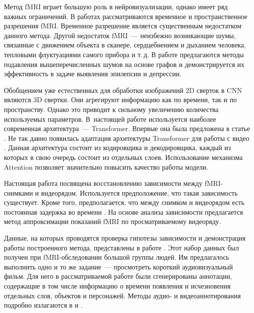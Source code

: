 \documentclass[a4paper, 12pt]{article}
\begin{document}
	Метод fMRI играет большую роль в нейровизуализации, однако имеет ряд важных ограничений.
	В работах \citep{menon1999spatial, logothetis2008we} рассматриваются 
	временное и пространственное разрешения fMRI. Временное разрешение является существенным
	недостатком данного метода. Другой недостаток fMRI~--- неизбежно возникающие шумы, 
	связанные с движением объекта в сканере, сердцебиением и дыханием человека, тепловыми
	флуктуациями самого прибора и т.\,д. В работе \citep{1804.10167} предлагаются методы 
	подавления вышеперечисленных шумов на основе графов и демонстрируется их эффективность в задаче
	выявления эпилепсии и депрессии.

	Обобщением уже естественных для обработки изображений 2D сверток в CNN являются 3D свертки.
	Они агрегируют информацию как по времени, так и по пространству.
	Однако это приводит к сильному увеличению количества используемых параметров.
	В~настоящей работе используется наиболее современная архитектура~--- Transformer.
	Впервые она была предложена в статье \citep{https://doi.org/10.48550/arxiv.1706.03762}.
	Не так давно появилась адаптация архитектуры Transformer для работы с видео
	\citep{https://doi.org/10.48550/arxiv.2201.04288}. Данная архитектура состоит из кодировщика
	и декодировщика, каждый из которых в свою очередь состоит из отдельных слоев. Использование 
	механизма Attention \citep{https://doi.org/10.48550/arxiv.1706.03762} 
	позволяет значительно повысить качество работы модели.

	Настоящая работа посвящена восстановлению зависимости между fMRI-снимками и видеорядом.
	Используется предположение, что такая зависимость существует.
	Кроме того, предполагается, что между снимком и видеорядом есть постоянная задержка во времени
	\citep{Logothetis2003}.
	На основе анализа зависимости предлагается метод аппроксимации показаний fMRI по
	просматриваемому видеоряду.

	Данные, на которых проводятся проверка гипотезы зависимости и демонстрация работы построенного 
	метода, представлены в работе \citep{Berezutskaya2022}. Этот набор данных был получен при
	fMRI-обследовании большой группы людей. Им предлагалось выполнить одно и то же задание~---
	просмотреть короткий аудиовизуальный фильм. Для него в рассматриваемой работе были 
	сгенерированы аннотации, содержащие в том числе информацию о времени появления и исчезновения
	отдельных слов, объектов и персонажей. Методы аудио- и видеоаннотирования подробно излагаются в
	\citep{boersma2018praat} и \citep{Berezutskaya2020}. 
\end{document}
